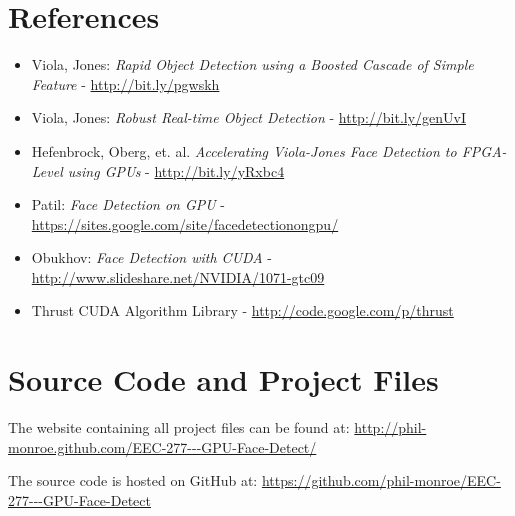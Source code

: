 \documentclass[12pt] {article}
\begin{document}
\footnotesize
\section{References}

\begin{itemize}
	\item Viola, Jones: {\it Rapid Object Detection using a Boosted Cascade of Simple Feature} - \url {http://bit.ly/pgwskh}
	\item Viola, Jones: {\it Robust Real-time Object Detection} - \url {http://bit.ly/genUvI}
	\item Hefenbrock, Oberg, et. al. {\it Accelerating Viola-Jones Face Detection to FPGA-Level using GPUs} - \url {http://bit.ly/yRxbc4}
	\item Patil: {\it Face Detection on GPU} - \url {https://sites.google.com/site/facedetectionongpu/}
	\item Obukhov: {\it Face Detection with CUDA} - \url {http://www.slideshare.net/NVIDIA/1071-gtc09}
	\item Thrust CUDA Algorithm Library - \url {http://code.google.com/p/thrust}
\end{itemize}

\section{Source Code and Project Files}

\hspace*{1.5em}The website containing all project files can be found at:
\newline \url {http://phil-monroe.github.com/EEC-277---GPU-Face-Detect/}
\vspace{5 mm}

The source code is hosted on GitHub at:
\newline \url {https://github.com/phil-monroe/EEC-277---GPU-Face-Detect}
\end{document}
